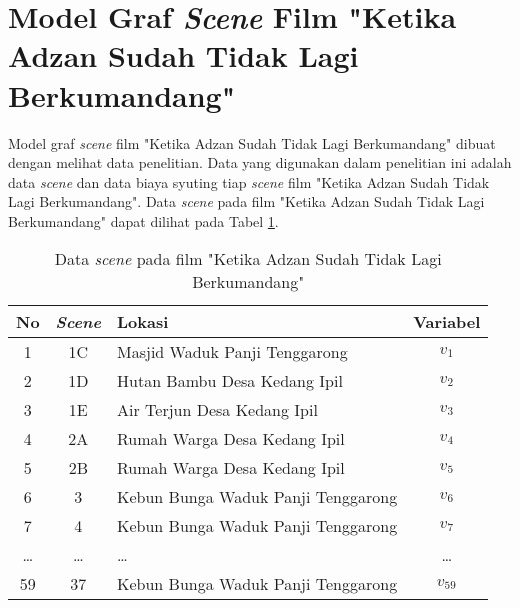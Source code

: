 \section{Model Graf \textit{Scene} Film "Ketika Adzan Sudah Tidak Lagi Berkumandang"}
\vspace{-4mm}
{\frenchspacing
    Model graf \textit{scene} film "Ketika Adzan Sudah Tidak Lagi Berkumandang" dibuat dengan melihat data penelitian.
    Data yang digunakan dalam penelitian ini adalah data \textit{scene} dan data biaya syuting tiap \textit{scene}
    film "Ketika Adzan Sudah Tidak Lagi Berkumandang".
    Data \textit{scene} pada film "Ketika Adzan Sudah Tidak Lagi Berkumandang" dapat dilihat pada Tabel \ref{tab: data scene}.

    \begin{table}
        \centering
        \caption{Data \textit{scene} pada film "Ketika Adzan Sudah Tidak Lagi Berkumandang"}
        \label{tab: data scene}
        \begin{tabular}{|c|c|l|c|}
            \hline
            \textbf{No} & \textbf{\textit{Scene}} & \textbf{Lokasi}                    & \textbf{Variabel} \\\hline
            1           & 1C                      & Masjid Waduk Panji Tenggarong      & $v_{1}$           \\\hline
            2           & 1D                      & Hutan Bambu Desa   Kedang Ipil     & $v_{2}$           \\\hline
            3           & 1E                      & Air Terjun Desa Kedang Ipil        & $v_{3}$           \\\hline
            4           & 2A                      & Rumah Warga Desa Kedang Ipil       & $v_{4}$           \\\hline
            5           & 2B                      & Rumah Warga Desa Kedang Ipil       & $v_{5}$           \\\hline
            6           & 3                       & Kebun Bunga Waduk Panji Tenggarong & $v_{6}$           \\\hline
            7           & 4                       & Kebun Bunga Waduk Panji Tenggarong & $v_{7}$           \\\hline
            \dots       & \dots                   & \dots                              & \dots             \\\hline
            59          & 37                      & Kebun Bunga Waduk Panji Tenggarong & $v_{59}$          \\\hline
        \end{tabular}
    \end{table}

}

